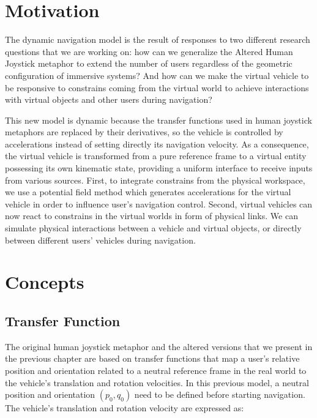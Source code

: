 
\section{Motivation}
The dynamic navigation model is the result of responses to two different research questions that we are working on: how can we generalize the Altered Human Joystick metaphor to extend the number of users regardless of the geometric configuration of immersive systems? And how can we make the virtual vehicle to be responsive to constrains coming from the virtual world to achieve interactions with virtual objects and other users during navigation?

This new model is dynamic because the transfer functions used in human joystick metaphors are replaced by their derivatives, so the vehicle is controlled by accelerations instead of setting directly its navigation velocity. As a consequence, the virtual vehicle is transformed from a pure reference frame to a virtual entity possessing its own kinematic state, providing a uniform interface to receive inputs from various sources. First, to integrate constrains from the physical workspace, we use a potential field method which generates accelerations for the virtual vehicle in order to influence user's navigation control. Second, virtual vehicles can now react to constrains in the virtual worlds in form of physical links. We can simulate physical interactions between a vehicle and virtual objects, or directly between different users' vehicles during navigation. 




\section{Concepts}

\subsection{Transfer Function}
The original human joystick metaphor and the altered versions that we present in the previous chapter are based on transfer functions that map a user's relative position and orientation related to a neutral reference frame in the real world to the vehicle's translation and rotation velocities. In this previous model, a neutral position and orientation $(p_{0},q_{0})$ need to be defined before starting navigation. The vehicle's translation and rotation velocity are expressed as:


